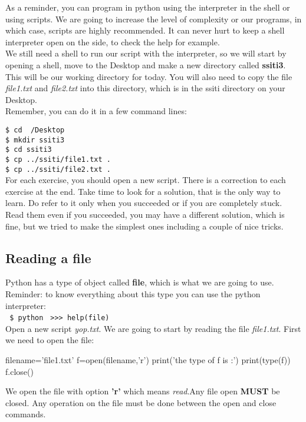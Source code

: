 \documentclass[article,10pt]{scrartcl}
\begin{document}
As a reminder, you can program in python using the interpreter in the shell or using scripts. We are going to increase the level of complexity or our programs, in which case, scripts are highly recommended. It can never hurt to keep a shell interpreter open on the side, to check the help for example.
\\
We still need a shell to run our script with the interpreter, so we will start by opening a shell, move to the Desktop and make a new directory called \textbf{ssiti3}. This will be our working directory for today. You will also need to copy the file \textit{file1.txt} and \textit{file2.txt} into this directory, which is in the ssiti directory on your Desktop.\\
Remember, you can do it in a few command lines:

\texttt{\$ cd ~/Desktop}\\
\texttt{\$ mkdir ssiti3}\\
\texttt{\$ cd ssiti3}\\
\texttt{\$ cp ../ssiti/file1.txt .}\\
\texttt{\$ cp ../ssiti/file2.txt .}\\
For each exercise, you should open a new script. There is a correction to each exercise at the end. Take time to look for a solution, that is the only way to learn. Do refer to it only when you succeeded or if you are completely stuck. Read them even if you succeeded, you may have a different solution, which is fine, but we tried to make the simplest ones including a couple of nice tricks.
\subsection*{Reading a file}
Python has a type of object called \textbf{file}, which is what we are going to use. Reminder: to know everything about this type you can use the python interpreter:\\
\texttt{ \$ python}
\texttt{ >>> help(file)}\\


Open a new script \textit{yop.txt}. We are going to start by reading the file \textit{file1.txt}. First we need to open the file:

\begin{python}
filename='file1.txt'
f=open(filename,'r')
print('the type of f is :')
print(type(f))
f.close()
\end{python}
We open the file with option \textbf{'r'} which means \textit{read}.Any file open \textbf{MUST} be closed. Any operation on the file must be done between the open and close commands.\\
\end{document}
